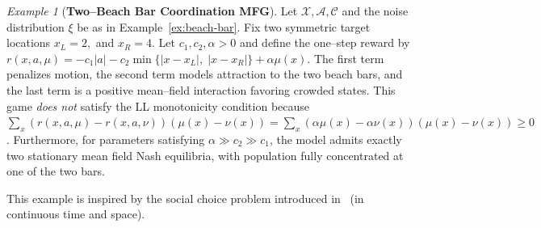 \documentclass[10pt,twocolumn,letterpaper]{article}
\theoremstyle{definition}
\theoremstyle{remark}
\newtheorem{example}{Example}
\newcommand{\states}{\mathcal{X}}
\newcommand{\actions}{\mathcal{A}}
\newcommand{\noises}{\mathcal{C}}
\begin{document}
\begin{example}[\textbf{Two–Beach Bar Coordination MFG}]
\label{ex:two-beach-bar}
Let $\states, \actions, \noises$ and the noise distribution $\xi$ be as in Example~\ref{ex:beach-bar}.  
Fix two symmetric target locations
$x_L = 2,$ and $x_R = 4.$ Let $c_1,c_2,\alpha > 0$ and define the one–step reward by
\(
r(x,a,\mu)
=
- c_1 |a|
- c_2 \min\bigl\{|x-x_L|,\;|x-x_R|\bigr\}
+ \alpha \mu(x).
\)
The first term penalizes motion, the second term models attraction to the two beach bars, and the last term is a positive mean–field interaction favoring crowded states. This game \emph{does not} satisfy the LL monotonicity condition because $\sum_x (r(x,a,\mu) - r(x,a,\nu))(\mu(x)-\nu(x)) = \sum_x (\alpha\mu(x)-\alpha\nu(x))(\mu(x)-\nu(x)) \ge 0$. Furthermore, for parameters satisfying $\alpha \gg c_2 \gg c_1$, the model admits exactly two stationary mean field Nash equilibria, with population fully concentrated at one of the two bars.
\end{example}
This example is inspired by the social choice problem introduced in~\citep{salhab2017dynamic} (in continuous time and space).
\end{document}
